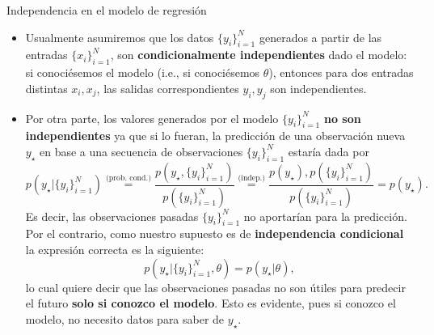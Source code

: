 \documentclass[handout, 9pt]{beamer}
\begin{document}
\begin{frame}{Independencia en el modelo de regresión}

\begin{itemize}
	\item Usualmente asumiremos que los datos $\{y_i\}_{i=1}^N$ generados a partir de las entradas $\{x_i\}_{i=1}^N$, son \textbf{condicionalmente independientes} dado el modelo: si conociésemos el modelo (i.e., si conociésemos $\theta$), entonces para dos entradas distintas $x_i,x_j$, las  salidas correspondientes $y_i,y_j$ son independientes.\pause
	\item  Por otra parte, los valores generados por el modelo $\{y_i\}_{i=1}^N$ \textbf{no son independientes} ya que si lo fueran, la predicción de una observación nueva $y_\star$ en base a una secuencia de observaciones $\{y_i\}_{i=1}^N$ estaría dada por
\begin{equation*}
	p(y_\star|\{y_i\}_{i=1}^N) 
	\stackrel{\text{(prob. cond.)}}{=} \frac{p(y_\star,\{y_i\}_{i=1}^N)} {p(\{y_i\}_{i=1}^N)} 
	\stackrel{\text{(indep.)}}{=} \frac{p(y_\star),p(\{y_i\}_{i=1}^N)} {p(\{y_i\}_{i=1}^N)}
	=p(y_\star).
\end{equation*}
Es decir, las observaciones pasadas $\{y_i\}_{i=1}^N$ no aportarían para la predicción. \pause Por  el contrario, como nuestro supuesto es de \textbf{independencia condicional} la expresión correcta es  la siguiente: 
\begin{equation*}
	p(y_\star|\{y_i\}_{i=1}^N,\theta)  
	=p(y_\star|\theta),
\end{equation*}\pause
lo cual quiere decir que las  observaciones pasadas no son útiles para predecir el  futuro \textbf{solo si conozco el modelo}. Esto es evidente, pues si conozco el modelo, no necesito datos para saber de $y_\star$.

\end{itemize}
	
\end{frame}
\end{document}
